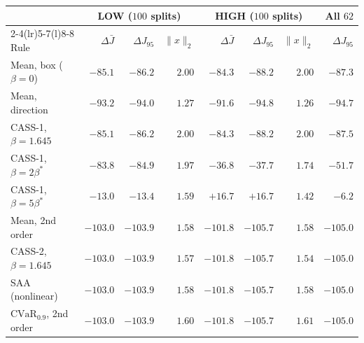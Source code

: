 \begin{tabular}{@{}lrrrrrrr@{}}
\toprule
 & \multicolumn{3}{c}{LOW ($100$ splits)} & \multicolumn{3}{c}{HIGH ($100$ splits)} & All $62$\\
\cmidrule(lr){2-4}\cmidrule(lr){5-7}\cmidrule(l){8-8}
Rule & $\Delta\bar J$ & $\Delta J_{95}$ & $\|x\|_2$ & $\Delta\bar J$ & $\Delta J_{95}$ & $\|x\|_2$ & $\Delta J_{95}$\\
\midrule
Mean, box ($\beta=0$) & $-85.1$ & $-86.2$ & $2.00$ & $-84.3$ & $-88.2$ & $2.00$ & $-87.3$\\
Mean, direction & $-93.2$ & $-94.0$ & $1.27$ & $-91.6$ & $-94.8$ & $1.26$ & $-94.7$\\
CASS-1, $\beta=1.645$ & $-85.1$ & $-86.2$ & $2.00$ & $-84.3$ & $-88.2$ & $2.00$ & $-87.5$\\
CASS-1, $\beta=2\beta^*$ & $-83.8$ & $-84.9$ & $1.97$ & $-36.8$ & $-37.7$ & $1.74$ & $-51.7$\\
CASS-1, $\beta=5\beta^*$ & $-13.0$ & $-13.4$ & $1.59$ & $+16.7$ & $+16.7$ & $1.42$ & $-6.2$\\
Mean, 2nd order & $-103.0$ & $-103.9$ & $1.58$ & $-101.8$ & $-105.7$ & $1.58$ & $-105.0$\\
CASS-2, $\beta=1.645$ & $-103.0$ & $-103.9$ & $1.57$ & $-101.8$ & $-105.7$ & $1.54$ & $-105.0$\\
SAA (nonlinear) & $-103.0$ & $-103.9$ & $1.58$ & $-101.8$ & $-105.7$ & $1.58$ & $-105.0$\\
$\mathrm{CVaR}_{0.9}$, 2nd order & $-103.0$ & $-103.9$ & $1.60$ & $-101.8$ & $-105.7$ & $1.61$ & $-105.0$\\
\bottomrule
\end{tabular}
